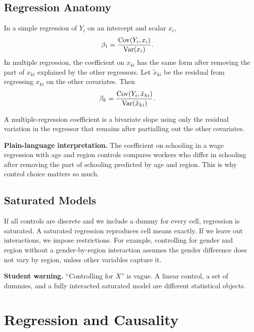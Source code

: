 \subsection{Regression Anatomy}

In a simple regression of \(Y_i\) on an intercept and scalar \(x_i\),
\[
    \beta_1=\frac{\mathrm{Cov}(Y_i,x_i)}{\mathrm{Var}(x_i)}.
\]
In multiple regression, the coefficient on \(x_{ki}\) has the same form after
removing the part of \(x_{ki}\) explained by the other regressors. Let
\(\tilde{x}_{ki}\) be the residual from regressing \(x_{ki}\) on the other
covariates. Then
\[
    \beta_k
    =
    \frac{\mathrm{Cov}(Y_i,\tilde{x}_{ki})}{\mathrm{Var}(\tilde{x}_{ki})}.
\]

\begin{thmN}
A multiple-regression coefficient is a bivariate slope using only the residual
variation in the regressor that remains after partialling out the other
covariates.
\end{thmN}

\begin{boxD}
\textbf{Plain-language interpretation.} The coefficient on schooling in a wage
regression with age and region controls compares workers who differ in schooling
after removing the part of schooling predicted by age and region. This is why
control choice matters so much.
\end{boxD}

\subsection{Saturated Models}

If all controls are discrete and we include a dummy for every cell, regression
is saturated. A saturated regression reproduces cell means exactly. If we leave
out interactions, we impose restrictions. For example, controlling for gender
and region without a gender-by-region interaction assumes the gender difference
does not vary by region, unless other variables capture it.

\begin{boxF}
\textbf{Student warning.} ``Controlling for \(X\)'' is vague. A linear control,
a set of dummies, and a fully interacted saturated model are different
statistical objects.
\end{boxF}

\section{Regression and Causality}

